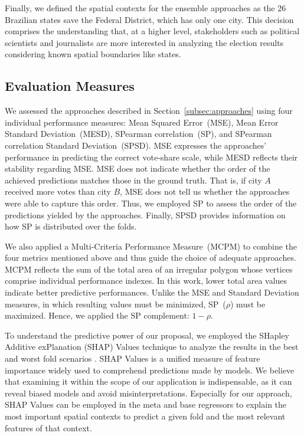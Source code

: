 \documentclass[runningheads]{llncs}
\begin{document}
Finally, we defined the spatial contexts for the ensemble approaches as the 26 Brazilian states save the Federal District, which has only one city. This decision comprises the understanding that, at a higher level, stakeholders such as political scientists and journalists are more interested in analyzing the election results considering known spatial boundaries like states. %


\subsection{Evaluation Measures}
\label{subsec:measures}

We assessed the approaches described in Section~\ref{subsec:approaches} using four individual performance measures: Mean Squared Error~(MSE), Mean Error Standard Deviation~(MESD), SPearman correlation~(SP), and SPearman correlation Standard Deviation~(SPSD). MSE expresses the approaches' performance in predicting the correct vote-share scale, while MESD reflects their stability regarding MSE. MSE does not indicate whether the order of the achieved predictions matches those in the ground truth. That is, if city $A$ received more votes than city $B$, MSE does not tell us whether the approaches were able to capture this order. Thus, we employed SP to assess the order of the predictions yielded by the approaches. Finally, SPSD provides information on how SP is distributed over the folds.

We also applied a Multi-Criteria Performance Measure~(MCPM) \cite{Parmezan:2017} to combine the four metrics mentioned above and thus guide the choice of adequate approaches. MCPM reflects the sum of the total area of an irregular polygon whose vertices comprise individual performance indexes. In this work, lower total area values indicate better predictive performances. Unlike the MSE and Standard Deviation measures, in which resulting values must be minimized, SP~($\rho$) must be maximized. Hence, we applied the SP complement: $1 - \rho$.

To understand the predictive power of our proposal, we employed the SHapley Additive exPlanation (SHAP) Values technique to analyze the results in the best and worst fold scenarios \cite{lundberg2017unified}. SHAP Values is a unified measure of feature importance widely used to comprehend predictions made by models. We believe that examining it within the scope of our application is indispensable, as it can reveal biased models and avoid misinterpretations. Especially for our approach, SHAP Values can be employed in the meta and base regressors to explain the most important spatial contexts to predict a given fold and the most relevant features of that context.
\end{document}
